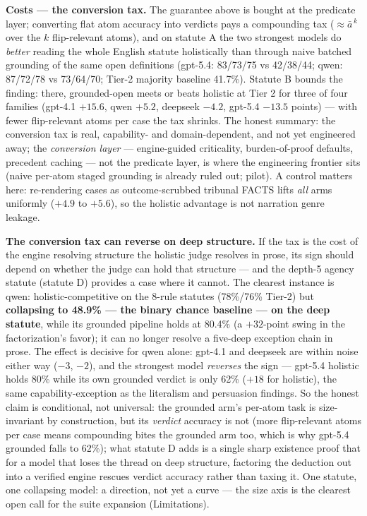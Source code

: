\textbf{Costs --- the conversion tax.} The guarantee above is bought at the
predicate layer; converting flat atom accuracy into verdicts pays a
compounding tax ($\approx \bar a^{\,k}$ over the $k$ flip-relevant atoms),
and on statute A the two strongest models do \emph{better} reading the whole
English statute holistically than through naive batched grounding of the
same open definitions (gpt-5.4: 83/73/75 vs 42/38/44; qwen: 87/72/78 vs
73/64/70; Tier-2 majority baseline 41.7\%). Statute B bounds the finding:
there, grounded-open meets or beats holistic at Tier 2 for three of four
families (gpt-4.1 $+15.6$, qwen $+5.2$, deepseek $-4.2$, gpt-5.4 $-13.5$
points) --- with fewer flip-relevant atoms per case the tax shrinks. The
honest summary: the conversion tax is real, capability- and
domain-dependent, and not yet engineered away; the \emph{conversion layer}
--- engine-guided criticality, burden-of-proof defaults, precedent caching
--- not the predicate layer, is where the engineering frontier sits (naive
per-atom staged grounding is already ruled out; pilot). A control matters
here: re-rendering cases as outcome-scrubbed tribunal FACTS lifts \emph{all}
arms uniformly ($+4.9$ to $+5.6$), so the holistic advantage is not
narration genre leakage.

\textbf{The conversion tax can reverse on deep structure.} If the tax is the
cost of the engine resolving structure the holistic judge resolves in prose,
its sign should depend on whether the judge can hold that structure --- and
the depth-5 agency statute (statute D) provides a case where it cannot. The
clearest instance is qwen: holistic-competitive on the 8-rule statutes
(78\%/76\% Tier-2) but \textbf{collapsing to 48.9\% --- the binary chance
baseline --- on the deep statute}, while its grounded pipeline holds at
80.4\% (a $+32$-point swing in the factorization's favor); it can no longer
resolve a five-deep exception chain in prose. The effect is decisive for
qwen alone: gpt-4.1 and deepseek are within noise either way ($-3$, $-2$),
and the strongest model \emph{reverses} the sign --- gpt-5.4 holistic holds
80\% while its own grounded verdict is only 62\% ($+18$ for holistic), the
same capability-exception as the literalism and persuasion findings. So the
honest claim is conditional, not universal: the grounded arm's per-atom task
is size-invariant by construction, but its \emph{verdict} accuracy is not
(more flip-relevant atoms per case means compounding bites the grounded arm
too, which is why gpt-5.4 grounded falls to 62\%); what statute D adds is a
single sharp existence proof that for a model that loses the thread on deep
structure, factoring the deduction out into a verified engine rescues verdict
accuracy rather than taxing it. One statute, one collapsing model: a
direction, not yet a curve --- the size axis is the clearest open call for
the suite expansion (Limitations).

